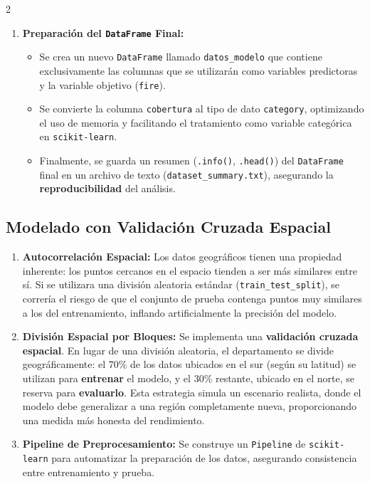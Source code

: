 \documentclass[a4paper,10pt]{article}
\begin{document}
\begin{multicols}{2}
\begin{enumerate}
    \item \textbf{Preparación del \texttt{DataFrame} Final:}
    \begin{itemize}
        \item Se crea un nuevo \texttt{DataFrame} llamado \texttt{datos\_modelo} que contiene exclusivamente las columnas que se utilizarán como variables predictoras y la variable objetivo (\texttt{fire}).
        \item Se convierte la columna \texttt{cobertura} al tipo de dato \texttt{category}, optimizando el uso de memoria y facilitando el tratamiento como variable categórica en \texttt{scikit-learn}.
        \item Finalmente, se guarda un resumen (\texttt{.info()}, \texttt{.head()}) del \texttt{DataFrame} final en un archivo de texto (\texttt{dataset\_summary.txt}), asegurando la \textbf{reproducibilidad} del análisis.
    \end{itemize}
\end{enumerate}

\subsection{Modelado con Validación Cruzada Espacial}

\begin{enumerate}
     \item \textbf{Autocorrelación Espacial:} Los datos geográficos tienen una propiedad inherente: los puntos cercanos en el espacio tienden a ser más similares entre sí. Si se utilizara una división aleatoria estándar (\texttt{train\_test\_split}), se correría el riesgo de que el conjunto de prueba contenga puntos muy similares a los del entrenamiento, inflando artificialmente la precisión del modelo.

    \item \textbf{División Espacial por Bloques:} Se implementa una \textbf{validación cruzada espacial}. En lugar de una división aleatoria, el departamento se divide geográficamente: el 70\% de los datos ubicados en el sur (según su latitud) se utilizan para \textbf{entrenar} el modelo, y el 30\% restante, ubicado en el norte, se reserva para \textbf{evaluarlo}. Esta estrategia simula un escenario realista, donde el modelo debe generalizar a una región completamente nueva, proporcionando una medida más honesta del rendimiento.

    \item \textbf{Pipeline de Preprocesamiento:} Se construye un \texttt{Pipeline} de \texttt{scikit-learn} para automatizar la preparación de los datos, asegurando consistencia entre entrenamiento y prueba.
    

\end{enumerate}
\end{multicols}
\end{document}
